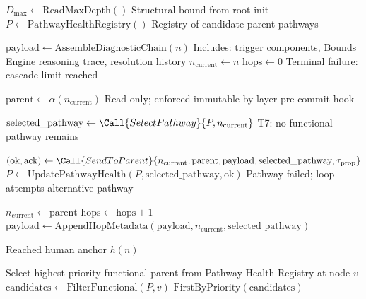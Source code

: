 \begin{algorithm}[t]
\caption{Escalation Algorithm}
\label{alg:escalation}
\begin{algorithmic}[1]
  \State $D_{\max} \gets \text{ReadMaxDepth}()$          \Comment Structural bound from root init
  \State $P \gets \text{PathwayHealthRegistry}()$      \Comment Registry of candidate parent pathways

  \State $\text{payload} \gets \text{AssembleDiagnosticChain}(n)$
  \Comment Includes: trigger components, Bounds Engine reasoning trace, resolution history
  \State $n_{\text{current}} \gets n$
  \State $\text{hops} \gets 0$
      \State \Return {}
      \Comment Terminal failure: cascade limit reached
    \EndIf

    \State $\text{parent} \gets \alpha(n_{\text{current}})$
    \Comment Read-only; enforced immutable by \fact{} layer pre-commit hook

    \State $\text{selected\_pathway} \gets \Call{SelectPathway}{P, n_{\text{current}}}$
      \State \Return {}
      \Comment T7: no functional pathway remains
    \EndIf

    \State $(\text{ok}, \text{ack}) \gets \Call{SendToParent}{
      n_{\text{current}}, \text{parent}, \text{payload}, \text{selected\_pathway}, \tau_{\text{prop}}}$
    \State $P \gets \text{UpdatePathwayHealth}(P, \text{selected\_pathway}, \text{ok})$
      \State \Comment Pathway failed; loop attempts alternative pathway
      \State \Continue
    \EndIf

    \State $n_{\text{current}} \gets \text{parent}$
    \State $\text{hops} \gets \text{hops} + 1$
    \State $\text{payload} \gets \text{AppendHopMetadata}(\text{payload}, n_{\text{current}}, \text{selected\_pathway})$
  \EndWhile

  \State \Comment Reached human anchor $h(n)$
  \State {}
  \State \Return {}
\EndFunction

\Statex
{}
  \State \Comment Select highest-priority functional parent from Pathway Health Registry at node $v$
  \State $\text{candidates} \gets \text{FilterFunctional}(P, v)$
  \State \Return $\text{FirstByPriority}(\text{candidates})$
\EndFunction
\end{algorithmic}
\end{algorithm}

